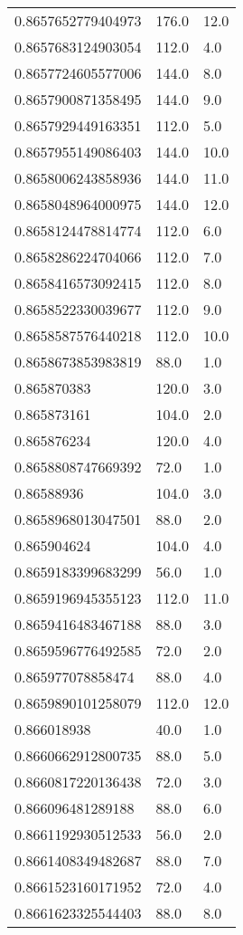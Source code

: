 \begin{center}
\begin{supertabular}[H]{p{0.30\textwidth}p{0.05\textwidth}p{0.05\textwidth}}
0.8657652779404973 & 176.0 & 12.0 \\ 
0.8657683124903054 & 112.0 & 4.0 \\ 
0.8657724605577006 & 144.0 & 8.0 \\ 
0.8657900871358495 & 144.0 & 9.0 \\ 
0.8657929449163351 & 112.0 & 5.0 \\ 
0.8657955149086403 & 144.0 & 10.0 \\ 
0.8658006243858936 & 144.0 & 11.0 \\ 
0.8658048964000975 & 144.0 & 12.0 \\ 
0.8658124478814774 & 112.0 & 6.0 \\ 
0.8658286224704066 & 112.0 & 7.0 \\ 
0.8658416573092415 & 112.0 & 8.0 \\ 
0.8658522330039677 & 112.0 & 9.0 \\ 
0.8658587576440218 & 112.0 & 10.0 \\ 
0.8658673853983819 & 88.0 & 1.0 \\ 
0.865870383 & 120.0 & 3.0 \\ 
0.865873161 & 104.0 & 2.0 \\ 
0.865876234 & 120.0 & 4.0 \\ 
0.8658808747669392 & 72.0 & 1.0 \\ 
0.86588936 & 104.0 & 3.0 \\ 
0.8658968013047501 & 88.0 & 2.0 \\ 
0.865904624 & 104.0 & 4.0 \\ 
0.8659183399683299 & 56.0 & 1.0 \\ 
0.8659196945355123 & 112.0 & 11.0 \\ 
0.8659416483467188 & 88.0 & 3.0 \\ 
0.8659596776492585 & 72.0 & 2.0 \\ 
0.865977078858474 & 88.0 & 4.0 \\ 
0.8659890101258079 & 112.0 & 12.0 \\ 
0.866018938 & 40.0 & 1.0 \\ 
0.8660662912800735 & 88.0 & 5.0 \\ 
0.8660817220136438 & 72.0 & 3.0 \\ 
0.866096481289188 & 88.0 & 6.0 \\ 
0.8661192930512533 & 56.0 & 2.0 \\ 
0.8661408349482687 & 88.0 & 7.0 \\ 
0.8661523160171952 & 72.0 & 4.0 \\ 
0.8661623325544403 & 88.0 & 8.0 \\ 

\end{supertabular}
\end{center}
